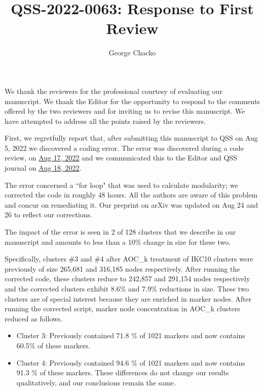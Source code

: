 \documentclass[11pt, oneside]{article}   	%
\title{QSS-2022-0063: Response to First Review}
\author{George Chacko}
\begin{document}
\maketitle
\section*{}

We thank the reviewers for the professional courtesy of evaluating our manuscript. We thank the Editor for the opportunity to respond to the comments 
offered by the two reviewers and for inviting us to revise this manuscript. We have attempted to address all the points raised by the reviewers.

First, we regretfully report that, after submitting this manuscript to QSS on Aug 5, 2022 we discovered a coding error. The error was discovered during a code review,
on \underline{Aug 17, 2022}  and we communicated this to the Editor and QSS journal on \underline{Aug 18, 2022}. 

The error concerned a ``for loop" that was used to calculate modularity; we corrected the code in roughly 48 hours. All the authors are aware of this problem and 
concur on remediating it. Our preprint on arXiv was updated on Aug 24 and 26 to reflect our corrections. 

The impact of the error is seen in 2 of 128 clusters  that we describe in our manuscript and amounts to less than a 10\% change in size for these two.
 
Specifically, clusters \#3 and \#4 after AOC\_k treatment of IKC10 clusters were previously of size 265,681 and 316,185 nodes respectively. After running the corrected code, these
clusters reduce to 242,857 and 291,154 nodes respectively and the corrected clusters exhibit 8.6\% and 7.9\% reductions in size. These two clusters are of special interest because 
they are  enriched in marker nodes. After running the corrected script, marker node concentration in AOC\_k clusters reduced as follows. 

\begin{itemize}
\item Cluster 3: Previously contained 71.8 \% of 1021 markers and now contains 60.5\% of these markers.
\item Cluster 4: Previously contained 94.6 \% of 1021 markers and now contains 91.3 \% of these markers. These differences do not change our results qualitatively, and our conclusions remain the same. 
\end{itemize}
\end{document}
